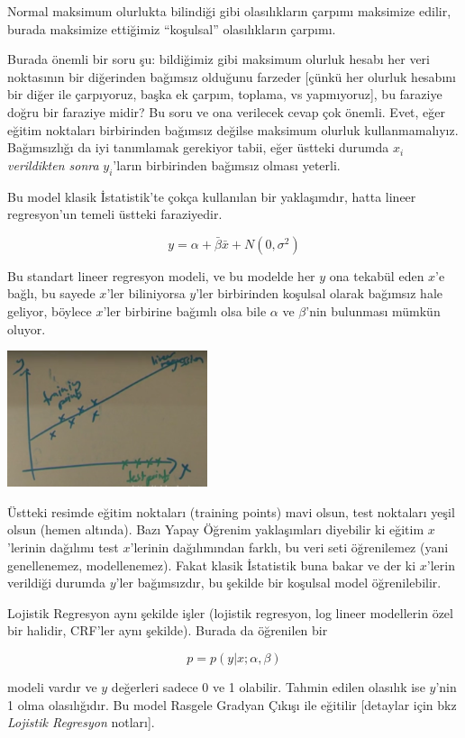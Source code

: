 \documentclass[12pt,fleqn]{article}\usepackage{../../common}
\begin{document}
Normal maksimum olurlukta bilindiği gibi olasılıkların çarpımı maksimize
edilir, burada maksimize ettiğimiz ``koşulsal'' olasılıkların çarpımı. 

Burada önemli bir soru şu: bildiğimiz gibi maksimum olurluk hesabı her veri
noktasının bir diğerinden bağımsız olduğunu farzeder [çünkü her olurluk
hesabını bir diğer ile çarpıyoruz, başka ek çarpım, toplama, vs
yapmıyoruz], bu faraziye doğru bir faraziye midir? Bu soru ve ona verilecek
cevap çok önemli. Evet, eğer eğitim noktaları birbirinden bağımsız değilse
maksimum olurluk kullanmamalıyız. Bağımsızlığı da iyi tanımlamak gerekiyor
tabii, eğer üstteki durumda $x_i$ {\em verildikten sonra} $y_i$'ların
birbirinden bağımsız olması yeterli.

Bu model klasik İstatistik'te çokça kullanılan bir yaklaşımdır, hatta
lineer regresyon'un temeli üstteki faraziyedir. 

$$ y = \alpha + \bar{\beta}\bar{x} + N(0,\sigma^2) $$

Bu standart lineer regresyon modeli, ve bu modelde her $y$ ona tekabül eden
$x$'e bağlı, bu sayede $x$'ler biliniyorsa $y$'ler birbirinden koşulsal
olarak bağımsız hale geliyor, böylece $x$'ler birbirine bağımlı olsa bile
$\alpha$ ve $\beta$'nin bulunması mümkün oluyor. 

\includegraphics[height=4cm]{crf_1.png}

Üstteki resimde eğitim noktaları (training points) mavi olsun, test noktaları
yeşil olsun (hemen altında). Bazı Yapay Öğrenim yaklaşımları diyebilir ki eğitim
$x$'lerinin dağılımı test $x$'lerinin dağılımından farklı, bu veri seti
öğrenilemez (yani genellenemez, modellenemez). Fakat klasik İstatistik buna
bakar ve der ki $x$'lerin verildiği durumda $y$'ler bağımsızdır, bu şekilde bir
koşulsal model öğrenilebilir.

Lojistik Regresyon aynı şekilde işler (lojistik regresyon, log lineer
modellerin özel bir halidir, CRF'ler aynı şekilde). Burada
da öğrenilen bir

$$ p = p(y | x;\alpha,\beta) $$

modeli vardır ve $y$ değerleri sadece 0 ve 1 olabilir. Tahmin edilen
olasılık ise $y$'nin 1 olma olasılığıdır. Bu model Rasgele Gradyan Çıkışı
ile eğitilir [detaylar için bkz {\em Lojistik Regresyon} notları].
\end{document}
